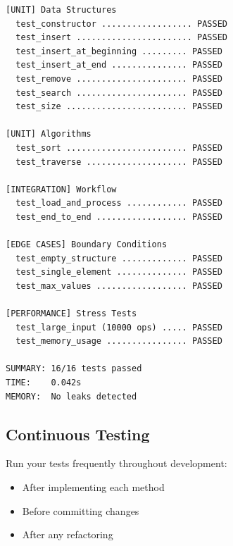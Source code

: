 \begin{lstlisting}[style=plaintext]
[UNIT] Data Structures
  test_constructor .................. PASSED
  test_insert ....................... PASSED
  test_insert_at_beginning ......... PASSED
  test_insert_at_end ............... PASSED
  test_remove ...................... PASSED
  test_search ...................... PASSED
  test_size ........................ PASSED

[UNIT] Algorithms
  test_sort ........................ PASSED
  test_traverse .................... PASSED

[INTEGRATION] Workflow
  test_load_and_process ............ PASSED
  test_end_to_end .................. PASSED

[EDGE CASES] Boundary Conditions
  test_empty_structure ............. PASSED
  test_single_element .............. PASSED
  test_max_values .................. PASSED

[PERFORMANCE] Stress Tests
  test_large_input (10000 ops) ..... PASSED
  test_memory_usage ................ PASSED

SUMMARY: 16/16 tests passed
TIME:    0.042s
MEMORY:  No leaks detected
\end{lstlisting}

\subsection{Continuous Testing}

Run your tests frequently throughout development:

\begin{itemize}
  \item After implementing each method
  \item Before committing changes
  \item After any refactoring
\end{itemize}
